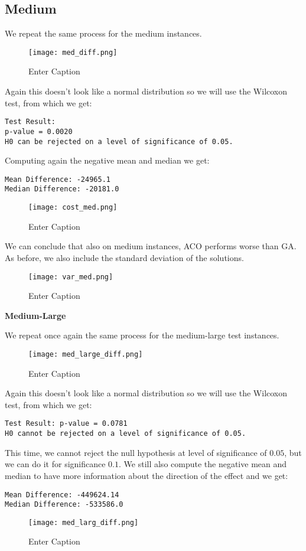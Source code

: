\documentclass{article}
\begin{document}
\subsection{Medium}

We repeat the same process for the medium instances.
\begin{figure}[H]
    \centering
    \texttt{[image: med\_diff.png]}
    \caption{Enter Caption}
    \label{fig:enter-label}
\end{figure}
Again this doesn't look like a normal distribution so we will use the Wilcoxon test, from which we get:
\begin{verbatim}
Test Result: 
p-value = 0.0020 
H0 can be rejected on a level of significance of 0.05. 
\end{verbatim}
Computing again the negative mean and median we get:
\begin{verbatim}
Mean Difference: -24965.1 
Median Difference: -20181.0 
\end{verbatim}
\begin{figure}[H]
    \centering
    \texttt{[image: cost\_med.png]}
    \caption{Enter Caption}
    \label{fig:enter-label}
\end{figure}

We can conclude that also on medium instances, ACO performs worse than GA.
As before, we also include the standard deviation of the solutions.

\begin{figure}[H]
    \centering
    \texttt{[image: var\_med.png]}
    \caption{Enter Caption}
    \label{fig:enter-label}
\end{figure}

\textbf{Medium-Large}

We repeat once again the same process for the medium-large test instances.
\begin{figure}[H]
    \centering
    \texttt{[image: med\_large\_diff.png]}
    \caption{Enter Caption}
    \label{fig:enter-label}
\end{figure}

Again this doesn't look like a normal distribution so we will use the Wilcoxon test, from which we get:
\begin{verbatim}
Test Result: p-value = 0.0781 
H0 cannot be rejected on a level of significance of 0.05. 
\end{verbatim}
This time, we cannot reject the null hypothesis at level of significance of $0.05$, but we can do it for significance $0.1$. We still also compute the negative mean and median to have more information about the direction of the effect and we get:
\begin{verbatim}
Mean Difference: -449624.14 
Median Difference: -533586.0 
\end{verbatim}
\begin{figure}[H]
    \centering
    \texttt{[image: med\_larg\_diff.png]}
    \caption{Enter Caption}
    \label{fig:enter-label}
\end{figure}
\end{document}
